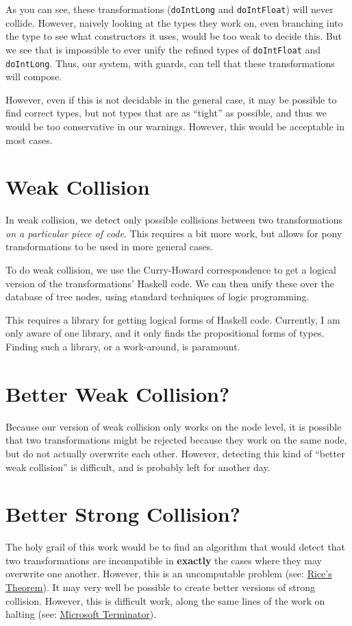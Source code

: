 \documentclass[11pt]{article}
\begin{document}
As you can see, these transformations (\verb~doIntLong~ and \verb~doIntFloat~) will never collide. However, naively looking at the types they work on, even branching into the type to see what constructors it uses, would be too weak to decide this. But we see that is impossible to ever unify the refined types of \verb~doIntFloat~ and \verb~doIntLong~. Thus, our system, with guards, can tell that these transformations will compose.

However, even if this is not decidable in the general case, it may be possible to find correct types, but not types that are as ``tight'' as possible, and thus we would be too conservative in our warnings. However, this would be acceptable in most cases.
\section{Weak Collision}
\label{sec-3}


In weak collision, we detect only possible collisions between two transformations \emph{on a particular piece of code}. This requires a bit more work, but allows for pony transformations to be used in more general cases.

To do weak collision, we use the Curry-Howard correspondence to get a logical version of the transformations' Haskell code. We can then unify these over the database of tree nodes, using standard techniques of logic programming. 

This requires a library for getting logical forms of Haskell code. Currently, I am only aware of one library, and it only finds the propositional forms of types. Finding such a library, or a work-around, is paramount.
\section{Better Weak Collision?}
\label{sec-4}


Because our version of weak collision only works on the node level, it is possible that two transformations might be rejected because they work on the same node, but do not actually overwrite each other. However, detecting this kind of ``better weak collision'' is difficult, and is probably left for another day.
\section{Better Strong Collision?}
\label{sec-5}


The holy grail of this work would be to find an algorithm that would detect that two transformations are incompatible in \textbf{exactly} the cases where they may overwrite one another. However, this is an uncomputable problem (see: \href{http://en.wikipedia.org/wiki/Rice's_theorem}{Rice's Theorem}). It may very well be possible to create better versions of strong collision. However, this is difficult work, along the same lines of the work on halting (see: \href{http://research.microsoft.com/en-us/um/cambridge/projects/terminator/}{Microsoft Terminator}).
\end{document}
